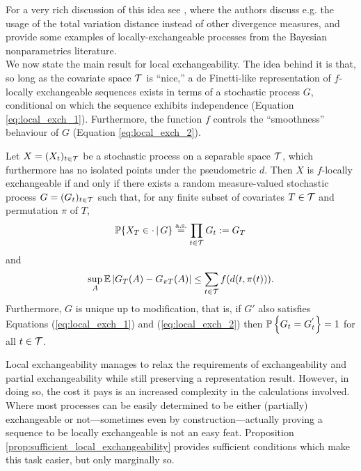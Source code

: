 For a very rich discussion of this idea see \cite{CampbellEtAl:2019:LocalExch}, where the authors discuss e.g. the usage of the total variation distance instead of other divergence measures, and provide some examples of locally-exchangeable processes from the Bayesian nonparametrics literature. \\



We now state the main result for local exchangeability. The idea behind it is that, so long as the covariate space $\mathcal{T}$ is ``nice,'' a de Finetti-like representation of $f$-locally exchangeable sequences exists in terms of a stochastic process $G$, conditional on which the sequence exhibits independence (Equation \ref{eq:local_exch_1}). Furthermore, the function $f$ controls the ``smoothness'' behaviour of $G$ (Equation \ref{eq:local_exch_2}). 

\begin{theorem}[Campbell et al. (2019)] \label{thm:de_finetti_local}
	Let $X = (X_t)_{t \in \mathcal{T}}$ be a stochastic process on a separable space $\mathcal{T}$, which furthermore has no isolated points under the pseudometric $d$. Then $X$ is $f$-locally exchangeable if and only if there exists a random measure-valued stochastic process $G = (G_t)_{t \in \mathcal{T}}$ such that, for any finite subset of covariates $T \in \mathcal{T}$ and permutation $\pi$ of $T$,
	\begin{equation} \label{eq:local_exch_1}
		\mathbb{P} \{ X_T \in \cdot \, | \, G \} \overset{\mathrm{a.s.}}{=} \prod_{t \in \mathcal{T}} G_t := G_T
	\end{equation}
	and
	\begin{equation} \label{eq:local_exch_2}
		\sup_{A} \mathbb{E} \left| G_T(A) - G_{\pi T} (A) \right| \leq \sum_{t \in \mathcal{T}} f(d(t, \pi(t))).
	\end{equation}
	Furthermore, $G$ is unique up to modification, that is, if $G'$ also satisfies Equations (\ref{eq:local_exch_1}) and (\ref{eq:local_exch_2}) then $\mathbb{P} \left\{ G_t = G_t^{'} \right\} = 1$ for all $t \in \mathcal{T}$.
\end{theorem}


Local exchangeability manages to relax the requirements of exchangeability and partial exchangeability while still preserving a representation result. However, in doing so, the cost it pays is an increased complexity in the calculations involved. Where most processes can be easily determined to be either (partially) exchangeable or not---sometimes even by construction---actually proving a sequence to be locally exchangeable is not an easy feat. Proposition \ref{prop:sufficient_local_exchangeability} provides sufficient conditions which make this task easier, but only marginally so. 



